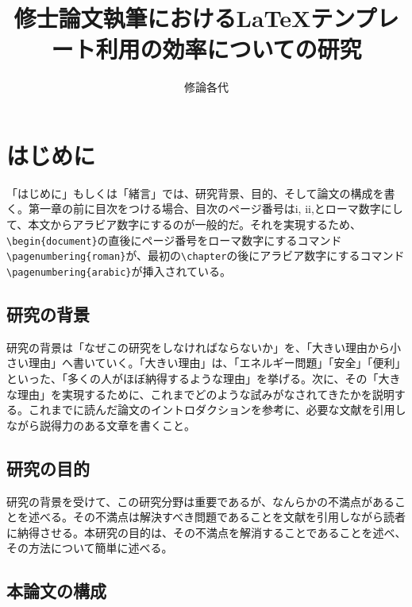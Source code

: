 \documentclass[titlepage]{jsreport}
\title{修士論文執筆におけるLaTeXテンプレート利用の効率についての研究}
\author{修論各代}
\begin{document}
\maketitle
{}

\tableofcontents
\pagestyle{plain}
\setcounter{page}{1}

\chapter{はじめに} \label{chap:introduction}

「はじめに」もしくは「緒言」では、研究背景、目的、そして論文の構成を書く。第一章の前に目次をつける場合、目次のページ番号はi, ii,とローマ数字にして、本文からアラビア数字にするのが一般的だ。それを実現するため、\verb|\begin{document}|の直後にページ番号をローマ数字にするコマンド\verb|\pagenumbering{roman}|が、最初の\verb|\chapter|の後にアラビア数字にするコマンド\verb|\pagenumbering{arabic}|が挿入されている。

\section{研究の背景}

研究の背景は「なぜこの研究をしなければならないか」を、「大きい理由から小さい理由」へ書いていく。「大きい理由」は、「エネルギー問題」「安全」「便利」といった、「多くの人がほぼ納得するような理由」を挙げる。次に、その「大きな理由」を実現するために、これまでどのような試みがなされてきたかを説明する。これまでに読んだ論文のイントロダクションを参考に、必要な文献を引用しながら説得力のある文章を書くこと。

\section{研究の目的}

研究の背景を受けて、この研究分野は重要であるが、なんらかの不満点があることを述べる。その不満点は解決すべき問題であることを文献を引用しながら読者に納得させる。本研究の目的は、その不満点を解消することであることを述べ、その方法について簡単に述べる。

\section{本論文の構成}
\end{document}

